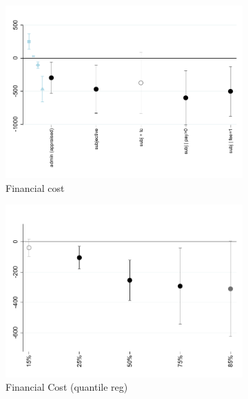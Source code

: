 \documentclass[11pt]{article}
\begin{document}
\begin{figure}[H]
    \caption{The effect of ``forcing'' (with fees)}
    \label{fc_pro2}
    \begin{center}
    \begin{subfigure}{0.45\textwidth}
        \caption{Financial cost}
        \centering
        \includegraphics[width=\textwidth]{Figuras/fc_te_pro_2.pdf}
    \end{subfigure}
        \begin{subfigure}{0.45\textwidth}
        \caption{Financial Cost (quantile reg)}
        \centering
        \includegraphics[width=\textwidth]{Figuras/fc_quantile_pro_2.pdf}
    \end{subfigure}
    \begin{subfigure}{0.55\textwidth}

\end{subfigure}
\end{center}
\end{figure}
\end{document}
